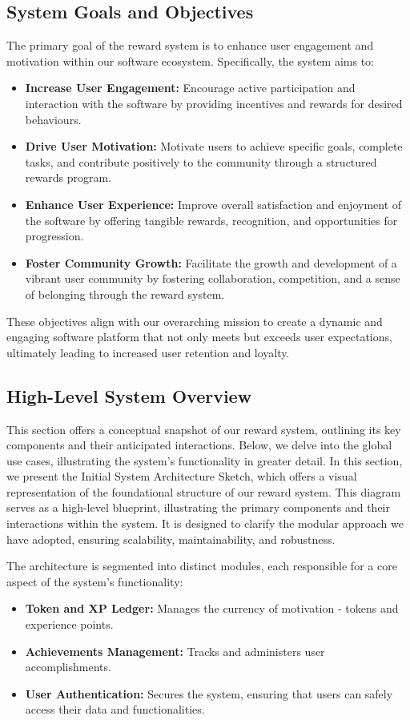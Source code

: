 \subsection*{System Goals and Objectives}
The primary goal of the reward system is to enhance user engagement and motivation within our software ecosystem. Specifically, the system aims to:
\begin{itemize}
    \item \textbf{Increase User Engagement:} Encourage active participation and interaction with the software by providing incentives and rewards for desired behaviours.
    \item \textbf{Drive User Motivation:} Motivate users to achieve specific goals, complete tasks, and contribute positively to the community through a structured rewards program.
    \item \textbf{Enhance User Experience:} Improve overall satisfaction and enjoyment of the software by offering tangible rewards, recognition, and opportunities for progression.
    \item \textbf{Foster Community Growth:} Facilitate the growth and development of a vibrant user community by fostering collaboration, competition, and a sense of belonging through the reward system.
\end{itemize}
These objectives align with our overarching mission to create a dynamic and engaging software platform that not only meets but exceeds user expectations, ultimately leading to increased user retention and loyalty.

\subsection{High-Level System Overview}
This section offers a conceptual snapshot of our reward system, outlining its key components and their anticipated interactions. Below, we delve into the global use cases, illustrating the system's functionality in greater detail.
In this section, we present the Initial System Architecture Sketch, which offers a visual representation of the foundational structure of our reward system. This diagram serves as a high-level blueprint, illustrating the primary components and their interactions within the system. It is designed to clarify the modular approach we have adopted, ensuring scalability, maintainability, and robustness.

The architecture is segmented into distinct modules, each responsible for a core aspect of the system's functionality:
\begin{itemize}
    \item \textbf{Token and XP Ledger:} Manages the currency of motivation - tokens and experience points.
    \item \textbf{Achievements Management:} Tracks and administers user accomplishments.
    \item \textbf{User Authentication:} Secures the system, ensuring that users can safely access their data and functionalities.
\end{itemize}

